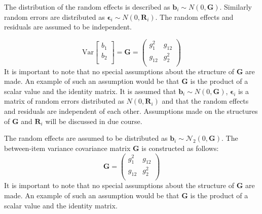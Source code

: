 \documentclass[12pt, a4paper]{report}
\theoremstyle{plain}
\theoremstyle{definition}
\theoremstyle{remark}
\begin{document}
The distribution of the random effects is described as $\boldsymbol{b}_i \sim N(0,\boldsymbol{G})$. Similarly  random errors are distributed as $\boldsymbol{\epsilon}_i \sim N(0,\boldsymbol{R}_i)$. The random effects and residuals are assumed to be independent. 

\[ \mbox{Var}  \left[
\begin{array}{c}
b_1   \\
b_2  \\
\end{array}
\right] =  \boldsymbol{G} =\left(
\begin{array}{cc}
g^2_1  & g_{12} \\
g_{12} & g^2_2 \\
\end{array}
\right) \]
It is important to note that no special assumptions about the structure of $\boldsymbol{G}$ are made. An example of such an assumption would be that $\boldsymbol{G}$ is the product of a scalar value and the identity matrix.
\bigskip
It is assumed that $\boldsymbol{b}_i \sim N(0,\boldsymbol{G})$,
$\boldsymbol{\epsilon}_i$ is a matrix of random errors distributed as $N(0,\boldsymbol{R}_i)$ and
that the random effects and residuals are independent of each other. Assumptions made on the structures of $\boldsymbol{G}$ and $\boldsymbol{R}_i$ will be discussed in due course.

\bigskip

The random effects are assumed to be distributed as $\boldsymbol{b}_i \sim \mathcal{N}_2(0,\boldsymbol{G})$. The between-item variance covariance matrix $\boldsymbol{G}$ is constructed as follows:
\[ \boldsymbol{G} =\left(
\begin{array}{cc}
g^2_1  & g_{12} \\
g_{12} & g^2_2 \\
\end{array}
\right) \]
It is important to note that no special assumptions about the structure of $\boldsymbol{G}$ are made. An example of such an assumption would be that $\boldsymbol{G}$ is the product of a scalar value and the identity matrix.

\end{document}
